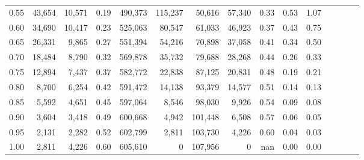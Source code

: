 \begin{tabular}{rrrcrrrrrrrrrrr}
0.55 &  43,654 &  10,571 &                                       0.19 &  490,373 &  115,237 &   50,616 &   57,340 &  0.33 &  0.53 &                         1.07 \\
0.60 &  34,690 &  10,417 &                                       0.23 &  525,063 &   80,547 &   61,033 &   46,923 &  0.37 &  0.43 &                         0.75 \\
0.65 &  26,331 &   9,865 &                                       0.27 &  551,394 &   54,216 &   70,898 &   37,058 &  0.41 &  0.34 &                         0.50 \\
0.70 &  18,484 &   8,790 &                                       0.32 &  569,878 &   35,732 &   79,688 &   28,268 &  0.44 &  0.26 &                         0.33 \\
0.75 &  12,894 &   7,437 &                                       0.37 &  582,772 &   22,838 &   87,125 &   20,831 &  0.48 &  0.19 &                         0.21 \\
0.80 &   8,700 &   6,254 &                                       0.42 &  591,472 &   14,138 &   93,379 &   14,577 &  0.51 &  0.14 &                         0.13 \\
0.85 &   5,592 &   4,651 &                                       0.45 &  597,064 &    8,546 &   98,030 &    9,926 &  0.54 &  0.09 &                         0.08 \\
0.90 &   3,604 &   3,418 &                                       0.49 &  600,668 &    4,942 &  101,448 &    6,508 &  0.57 &  0.06 &                         0.05 \\
0.95 &   2,131 &   2,282 &                                       0.52 &  602,799 &    2,811 &  103,730 &    4,226 &  0.60 &  0.04 &                         0.03 \\
1.00 &   2,811 &   4,226 &                                       0.60 &  605,610 &        0 &  107,956 &        0 &   nan &  0.00 &                         0.00 \\
\bottomrule
\end{tabular}
